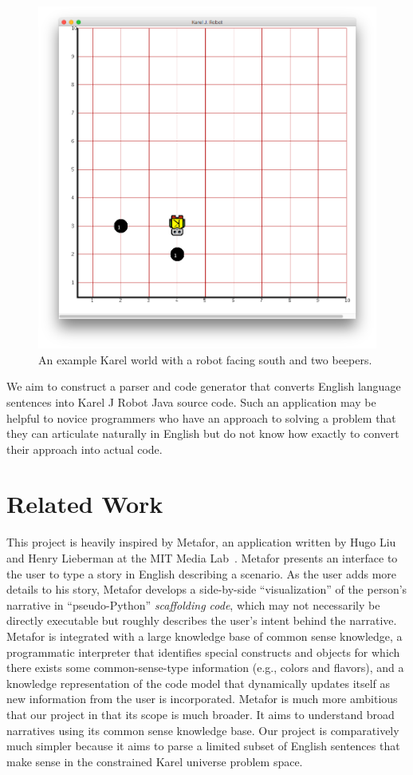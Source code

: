 \documentclass[11pt]{article}
\begin{document}
\begin{figure}[ht]
\centering
\includegraphics[width=\columnwidth]{karel-ex.png}
\caption{An example Karel world with a robot facing south and two beepers.}
\label{fig:karel-ex}
\end{figure}

We aim to construct a parser and code generator that converts English language sentences into Karel
J Robot Java source code. Such an application may be helpful to novice programmers who have an
approach to solving a problem that they can articulate naturally in English but do not know how
exactly to convert their approach into actual code.

\section{Related Work}
This project is heavily inspired by Metafor, an application written by Hugo Liu and Henry Lieberman
at the MIT Media Lab~. Metafor presents an interface to the user to type a
story in English describing a scenario. As the user adds more details to his story, Metafor
develops a side-by-side ``visualization'' of the person's narrative in ``pseudo-Python''
\emph{scaffolding code}, which may not necessarily be directly executable but roughly describes the
user's intent behind the narrative. Metafor is integrated with a large knowledge base of common
sense knowledge, a programmatic interpreter that identifies special constructs and objects for
which there exists some common-sense-type information (e.g., colors and flavors), and a knowledge
representation of the code model that dynamically updates itself as new information from the user
is incorporated. Metafor is much more ambitious that our project in that its scope is much broader.
It aims to understand broad narratives using its common sense knowledge base. Our project is
comparatively much simpler because it aims to parse a limited subset of English sentences that make
sense in the constrained Karel universe problem space.
\end{document}
